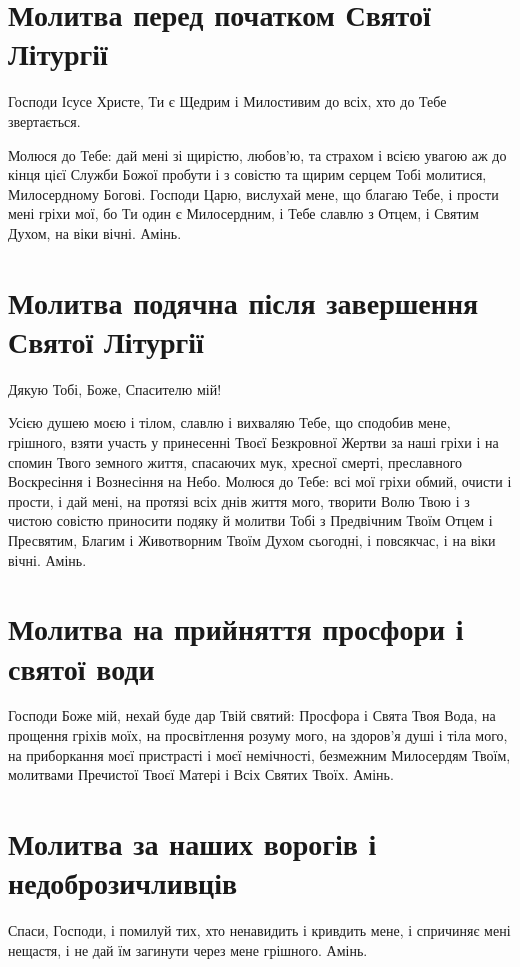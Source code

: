 \documentclass[chapters.tex]{subfiles}
\begin{document}
\section{Молитва перед початком Святої Літургії}
Господи Ісусе Христе, Ти є Щедрим і Милостивим до всіх, хто до Тебе звертається.

Молюся до Тебе: дай мені зі щирістю, любов’ю, та страхом і всією увагою аж до кінця цієї Служби Божої пробути і з совістю та щирим серцем Тобі молитися, Милосердному Богові. Господи Царю, вислухай мене, що благаю Тебе, і прости мені гріхи мої, бо Ти один є Милосердним, і Тебе славлю з Отцем, і Святим Духом, на віки вічні. Амінь.

\section{Молитва подячна після завершення Святої Літургії}
Дякую Тобі, Боже, Спасителю мій!

Усією душею моєю і тілом, славлю і вихваляю Тебе, що сподобив мене, грішного, взяти участь у принесенні Твоєї Безкровної Жертви за наші гріхи і на спомин Твого земного життя, спасаючих мук, хресної смерті, преславного Воскресіння і Вознесіння на Небо. Молюся до Тебе: всі мої гріхи обмий, очисти і прости, і дай мені, на протязі всіх днів життя мого, творити Волю Твою і з чистою совістю приносити подяку й молитви Тобі з Предвічним Твоїм Отцем і Пресвятим, Благим і Животворним Твоїм Духом сьогодні, і повсякчас, і на віки вічні. Амінь.

\section{Молитва на прийняття просфори і святої води}
Господи Боже мій, нехай буде дар Твій святий: Просфора і Свята Твоя Вода, на прощення гріхів моїх, на просвітлення розуму мого, на здоров’я душі і тіла мого, на приборкання моєї пристрасті і моєї немічності, безмежним Милосердям Твоїм, молитвами Пречистої Твоєї Матері і Всіх Святих Твоїх. Амінь.

\section{Молитва за наших ворогів і недоброзичливців}
Спаси, Господи, і помилуй тих, хто ненавидить і кривдить мене, і спричиняє мені нещастя, і не дай їм загинути через мене грішного. Амінь.
\end{document}
